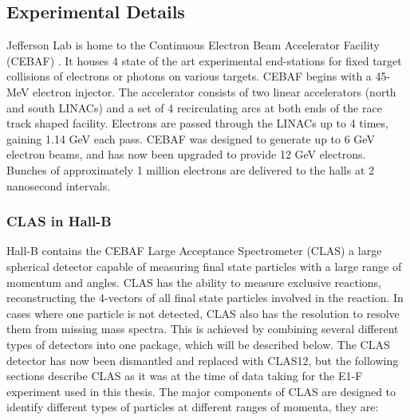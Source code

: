 \subsection{Experimental Details}
Jefferson Lab is home to the Continuous Electron Beam Accelerator Facility (CEBAF) \cite{hardware-leemann:2001}.  It houses 4 state of the art experimental end-stations for fixed target collisions of electrons or photons on various targets.  CEBAF begins with a 45-MeV electron injector.  The accelerator consists of two linear accelerators (north and south LINACs) and a set of 4 recirculating arcs at both ends of the race track shaped facility.  Electrons are passed through the LINACs up to 4 times, gaining 1.14 GeV each pass.  CEBAF was designed to generate up to 6 GeV electron beams, and has now been upgraded to provide 12 GeV electrons. Bunches of approximately 1 million electrons are delivered to the halls at 2 nanosecond intervals.

\subsubsection{CLAS in Hall-B}
Hall-B contains the CEBAF Large Acceptance Spectrometer (CLAS) a large spherical detector capable of measuring final state particles with a large range of momentum and angles.  CLAS has the ability to measure exclusive reactions, reconstructing the 4-vectors of all final state particles involved in the reaction.  In cases where one particle is not detected, CLAS also has the resolution to resolve them from missing mass spectra.  This is achieved by combining several different types of detectors into one package, which will be described below.  The CLAS detector has now been dismantled and replaced with CLAS12, but the following sections describe CLAS as it was at the time of data taking for the E1-F experiment used in this thesis.  The major components of CLAS \cite{hardware-mecking:2003} are designed to identify different types of particles at different ranges of momenta, they are:

